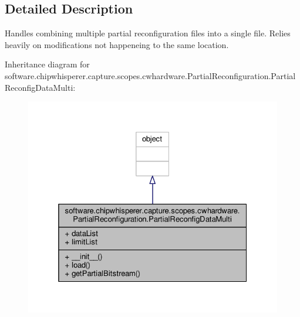 \subsection{Detailed Description}
\begin{DoxyVerb}Handles combining multiple partial reconfiguration files into a single file. Relies heavily on
modifications not happeneing to the same location. 
\end{DoxyVerb}
 

Inheritance diagram for software.\+chipwhisperer.\+capture.\+scopes.\+cwhardware.\+Partial\+Reconfiguration.\+Partial\+Reconfig\+Data\+Multi\+:\nopagebreak
\begin{figure}[H]
\begin{center}
\leavevmode
\includegraphics[width=325pt]{dd/d14/classsoftware_1_1chipwhisperer_1_1capture_1_1scopes_1_1cwhardware_1_1PartialReconfiguration_1_1P89614db86325f2de359a134cb29def96}
\end{center}
\end{figure}



